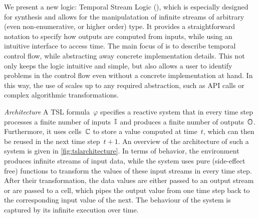 We present a new logic: Temporal Stream Logic (\TSL), which is
especially designed for synthesis and allows for the manipulatation of infinite
streams of arbitrary (even non-enumerative, or higher order) type. It
provides a straightforward notation to specify how outputs are
computed from inputs, while using an intuitive interface to access
time. The main focus of \TSL is to describe temporal control
flow, while abstracting away concrete implementation details. This not
only keeps the logic intuitive and simple, but also allows a user to identify
problems in the control flow even without a concrete implementation at
hand. In this way, the use of \TSL scales up to any required abstraction, such as API
calls or complex algorithmic transformations.

\medskip

\noindent \textit{Architecture} A TSL formula~$ \varphi $ specifies a
reactive system that in every time step processes a finite number of inputs~$ \mathbb{I} $
and produces a finite number of outputs~$ \mathbb{O} $. Furthermore, it
uses cells~$ \mathbb{C} $ to store a value computed at time~$ t $,
which can then be reused in the next time step~$ t + 1 $. An overview
of the architecture of such a system is given in \cref{fig:tslarchitecture}. In terms
of behavior, the environment produces infinite streams of input data,
while the system uses pure (side-effect free) functions to transform
the values of these input streams in every time step. After their
transformation, the data values are either passed to an output stream
or are passed to a cell, which pipes the output value from one time step back to the corresponding input value of the next.
The behaviour of the system is captured by its infinite execution over time.

